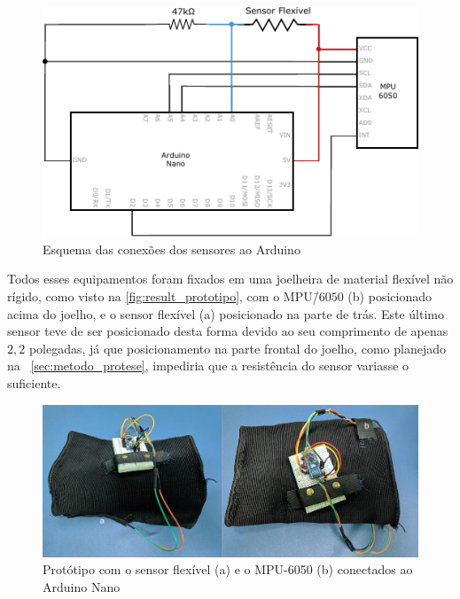 \begin{figure}[ht]
	\caption{\label{fig:result_schem}Esquema das conexões dos sensores ao Arduino}
	\begin{center}
	    \includegraphics[width=.8\textwidth]{resources/result_schem}
	\end{center}
\end{figure}

Todos esses equipamentos foram fixados em uma joelheira de material flexível não rígido, como visto na \autoref{fig:result_prototipo}, com o MPU\=/$6050$ (b) posicionado acima do joelho, e o sensor flexível (a) posicionado na parte de trás. Este último sensor teve de ser posicionado desta forma devido ao seu comprimento de apenas \(2{,}2\) polegadas, já que posicionamento na parte frontal do joelho, como planejado na ~\autoref{sec:metodo_protese}, impediria que a resistência do sensor variasse o suficiente.

\begin{figure}[ht]
	\caption{\label{fig:result_prototipo}Protótipo com o sensor flexível (a) e o MPU-6050 (b) conectados ao Arduino Nano}
	\begin{center}
	    \includegraphics[width=.8\textwidth]{resources/result_prototipo}
	\end{center}
\end{figure}

